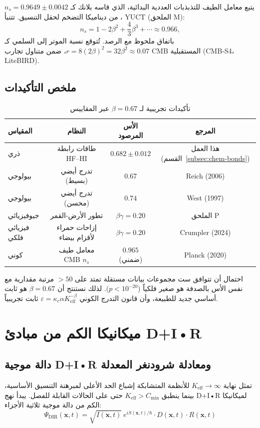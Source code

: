 \documentclass[11pt,a4paper]{article}
\begin{document}
	يتبع معامل الطيف للتذبذبات العددية البدائية، الذي قاسه بلانك كـ $n_s = 0.9649 \pm 0.0042$، من ديناميكا التضخم لحقل التنسيق. تتنبأ YUCT (الملحق M):
	\[
	n_s = 1 - 2\beta^2 + \frac{4}{3}\beta^3 + \cdots \approx 0.966,
	\]
	باتفاق ملحوظ مع الرصد. تُتوقع نسبة الموتر إلى السلمي كـ $r = 8(2\beta)^2 = 32\beta^2 \approx 0.07$، ضمن متناول تجارب CMB المستقبلية (CMB‑S4، LiteBIRD).
	
	\subsection{ملخص التأكيدات}
	
	\begin{table}[h]
		\centering
		\caption{تأكيدات تجريبية لـ $\beta = 0.67$ عبر المقاييس}
		\label{tab:confirmations}
		\begin{english}
			\begin{tabular}{lccc}
				\toprule
				المقياس & النظام & الأس المرصود & المرجع \\
				\midrule
				ذري & طاقات رابطة HF–HI & $0.682 \pm 0.012$ & هذا العمل (القسم~\ref{subsec:chem-bonds}) \\
				بيولوجي & تدرج أيضي (بسيط) & $0.67$ & Reich (2006) \\
				بيولوجي & تدرج أيضي (محسن) & $0.74$ & West (1997) \\
				جيوفيزيائي & تطور الأرض-القمر & $\beta\gamma = 0.20$ & الملحق P \\
				فيزيائي فلكي & إزاحات حمراء لأقزام بيضاء & $\beta\gamma = 0.20$ & Crumpler (2024) \\
				كوني & معامل طيف CMB $n_s$ & $0.965$ (ضمني) & Planck (2020) \\
				\bottomrule
			\end{tabular}
		\end{english}
	\end{table}
	
	احتمال أن تتوافق ست مجموعات بيانات مستقلة تمتد على $>50$ مرتبة مقدارية مع نفس الأس بالصدفة هو صغير فلكياً ($p < 10^{-20}$). لذلك نستنتج أن $\beta = 0.67$ هو ثابت أساسي جديد للطبيعة، وأن قانون التدرج الكوني $\varepsilon = \kappa_c \alpha K_{\mathrm{eff}}^{-\beta}$ ثابت تجريبياً.
	
	\section{ميكانيكا الكم من مبادئ D+I•R}
	\subsection{دالة موجية D+I•R ومعادلة شرودنغر المعدلة}
	تمثل نهاية $K_{\mathrm{eff}} \to \infty$ للأنظمة المتشابكة إشباع الحد الأعلى لمبرهنة التنسيق الأساسية، بينما ينطبق $K_{\mathrm{eff}} > C_{\min}$ حتى على الحالات القابلة للفصل.
	يبدأ نهج D+I•R لميكانيكا الكم من دالة موجية ثلاثية الأجزاء:
	\begin{equation}
		\Psi_{\text{DIR}}(\mathbf{x},t) = \sqrt{I(\mathbf{x},t)} \ e^{iS(\mathbf{x},t)/\hbar} \cdot D(\mathbf{x},t) \cdot R(\mathbf{x},t)
	\end{equation}
	
\end{document}
